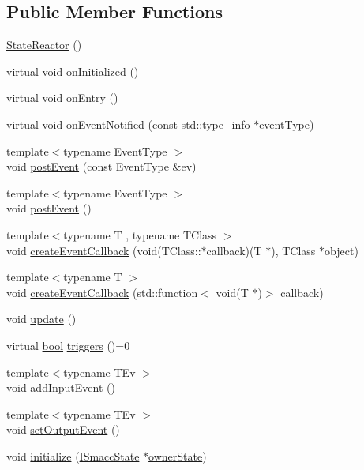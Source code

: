 \subsection*{Public Member Functions}
\begin{DoxyCompactItemize}
\item 
\hyperlink{classsmacc_1_1StateReactor_ae319e9f7b0a2a80b4c5ace6ec8c99fb2}{State\+Reactor} ()
\item 
virtual void \hyperlink{classsmacc_1_1StateReactor_aa10b2c6b7d1e80f01b00cbdac526a2bf}{on\+Initialized} ()
\item 
virtual void \hyperlink{classsmacc_1_1StateReactor_a11ed02721fd751b8272540645b88f4a6}{on\+Entry} ()
\item 
virtual void \hyperlink{classsmacc_1_1StateReactor_a17646b3c68a6d80d1e4da8c14238ce36}{on\+Event\+Notified} (const std\+::type\+\_\+info $\ast$event\+Type)
\item 
{\footnotesize template$<$typename Event\+Type $>$ }\\void \hyperlink{classsmacc_1_1StateReactor_a06303bdf908d04d5a6eb5f63131e68bd}{post\+Event} (const Event\+Type \&ev)
\item 
{\footnotesize template$<$typename Event\+Type $>$ }\\void \hyperlink{classsmacc_1_1StateReactor_a3d149851c5540110a29e9a7b3228239d}{post\+Event} ()
\item 
{\footnotesize template$<$typename T , typename T\+Class $>$ }\\void \hyperlink{classsmacc_1_1StateReactor_a68482e08f6449694a0bcda843b14b376}{create\+Event\+Callback} (void(T\+Class\+::$\ast$callback)(T $\ast$), T\+Class $\ast$object)
\item 
{\footnotesize template$<$typename T $>$ }\\void \hyperlink{classsmacc_1_1StateReactor_ac6b3a604009e5a68123aed27e70cf2be}{create\+Event\+Callback} (std\+::function$<$ void(T $\ast$)$>$ callback)
\item 
void \hyperlink{classsmacc_1_1StateReactor_aca5d4f7af06532272db55943b7810a43}{update} ()
\item 
virtual \hyperlink{classbool}{bool} \hyperlink{classsmacc_1_1StateReactor_a445bc3c90980d75d7d815b85cfb68b21}{triggers} ()=0
\item 
{\footnotesize template$<$typename T\+Ev $>$ }\\void \hyperlink{classsmacc_1_1StateReactor_acd4b35b4c82241fc27bb858761f6e4de}{add\+Input\+Event} ()
\item 
{\footnotesize template$<$typename T\+Ev $>$ }\\void \hyperlink{classsmacc_1_1StateReactor_ae9d0dd0c8cdcc57f8881f0962040c8ed}{set\+Output\+Event} ()
\item 
void \hyperlink{classsmacc_1_1StateReactor_a5c1d734e3a495fa0f2b01229a3dbac3f}{initialize} (\hyperlink{classsmacc_1_1ISmaccState}{I\+Smacc\+State} $\ast$\hyperlink{classsmacc_1_1StateReactor_aabd30af9412a8fea9ec5906f173d9d4a}{owner\+State})
\end{DoxyCompactItemize}
